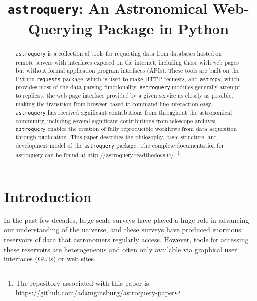 \documentclass[twocolumn]{aastex62}
\newcommand{\package}[1]{\texttt{#1}\xspace}
\newcommand{\astroquery}{\package{astroquery}}
\newcommand{\astropypkg}{\package{astropy}}
\begin{document}


\title{\astroquery: An Astronomical Web-Querying Package in Python}

\begin{abstract}
\astroquery is a collection of tools for requesting data from databases hosted
on remote servers with interfaces exposed on the internet, including those with
web pages but without formal application program interfaces (APIs).  These
tools are built on the Python
\package{requests} package,
which is used to make HTTP requests, and
\astropypkg, which provides most of the data parsing functionality.
\astroquery modules generally attempt to replicate the web page interface
provided by a given service as closely as possible, making the transition
from browser-based to command-line interaction easy.
\astroquery
has received significant contributions from throughout the astronomical community,
including several significant contributions from telescope archives.
\astroquery enables the creation of fully reproducible workflows from data
acquisition through publication.  This paper describes the philosophy, basic
structure, and development model of the \astroquery package.
The complete documentation for astroquery can be found at
\url{http://astroquery.readthedocs.io/}.
\footnote{%
The repository associated with this paper is:\\
\url{https://github.com/adamginsburg/astroquery-paper}
}
\end{abstract}


\section{Introduction}
In the past few decades, large-scale surveys have played a huge role in
advancing our understanding of the universe, and these surveys have produced
enormous reservoirs of data that astronomers regularly access.  However, tools
for accessing these reservoirs are heterogeneous and often only available via
graphical user interfaces (GUIs) or web sites.
\end{document}
